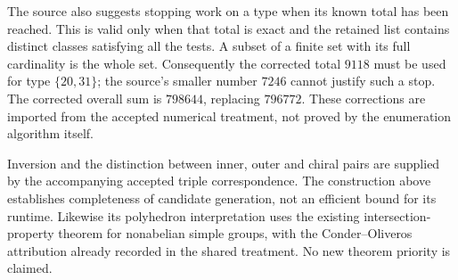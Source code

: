 \documentclass[11pt]{article}
\begin{document}
The source also suggests stopping work on a type when its known total
has been reached. This is valid only when that total is exact and the
retained list contains distinct classes satisfying all the tests.
A subset of a finite set with its full cardinality is the whole set.
Consequently the corrected total $9118$ must be used for type
$\{20,31\}$; the source's smaller number $7246$ cannot justify such a
stop. The corrected overall sum is $798644$, replacing $796772$.
These corrections are imported from the accepted numerical treatment,
not proved by the enumeration algorithm itself.

Inversion and the distinction between inner, outer and chiral pairs
are supplied by the accompanying accepted triple correspondence.
The construction above establishes completeness of candidate generation,
not an efficient bound for its runtime. Likewise its polyhedron
interpretation uses the existing intersection-property theorem for
nonabelian simple groups, with the Conder--Oliveros attribution already
recorded in the shared treatment. No new theorem priority is claimed.
\end{document}
